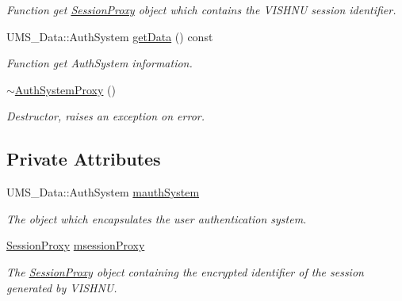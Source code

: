 \begin{DoxyCompactItemize}
\begin{DoxyCompactList}\small\item\em Function get \hyperlink{classSessionProxy}{SessionProxy} object which contains the VISHNU session identifier. \item\end{DoxyCompactList}\item 
UMS\_\-Data::AuthSystem \hyperlink{classAuthSystemProxy_a7b9143efdebc6fa8f9f3f376b888f89d}{getData} () const 
\begin{DoxyCompactList}\small\item\em Function get AuthSystem information. \item\end{DoxyCompactList}\item 
\hypertarget{classAuthSystemProxy_a987dcd3f79b88ab14e924623a6341c9a}{
\hyperlink{classAuthSystemProxy_a987dcd3f79b88ab14e924623a6341c9a}{$\sim$AuthSystemProxy} ()}
\label{classAuthSystemProxy_a987dcd3f79b88ab14e924623a6341c9a}

\begin{DoxyCompactList}\small\item\em Destructor, raises an exception on error. \item\end{DoxyCompactList}\end{DoxyCompactItemize}
\subsection*{Private Attributes}
\begin{DoxyCompactItemize}
\item 
\hypertarget{classAuthSystemProxy_a59fb693ce519c1bbc4fcb1e535deaa2d}{
UMS\_\-Data::AuthSystem \hyperlink{classAuthSystemProxy_a59fb693ce519c1bbc4fcb1e535deaa2d}{mauthSystem}}
\label{classAuthSystemProxy_a59fb693ce519c1bbc4fcb1e535deaa2d}

\begin{DoxyCompactList}\small\item\em The object which encapsulates the user authentication system. \item\end{DoxyCompactList}\item 
\hypertarget{classAuthSystemProxy_ae806c922284d36aca84b456064ce986a}{
\hyperlink{classSessionProxy}{SessionProxy} \hyperlink{classAuthSystemProxy_ae806c922284d36aca84b456064ce986a}{msessionProxy}}
\label{classAuthSystemProxy_ae806c922284d36aca84b456064ce986a}

\begin{DoxyCompactList}\small\item\em The \hyperlink{classSessionProxy}{SessionProxy} object containing the encrypted identifier of the session generated by VISHNU. \item\end{DoxyCompactList}\end{DoxyCompactItemize}


